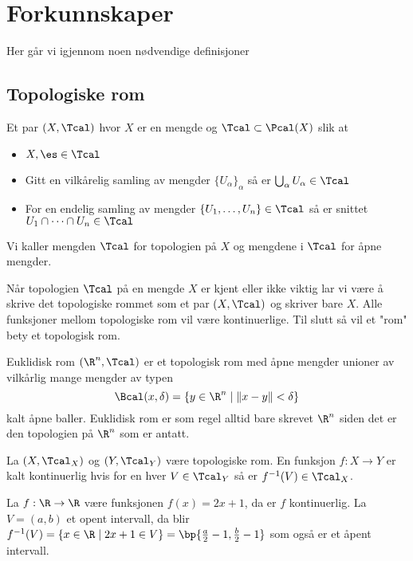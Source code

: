 \section{Forkunnskaper}
Her går vi igjennom noen nødvendige definisjoner

\subsection{Topologiske rom}\label{Sec:Top}
\begin{definition}\label{Def:TopRom}
    Et par $(X,\Tcal)$ hvor $X$ er en mengde og $\Tcal\subset\Pcal(X)$ slik at 
    \begin{itemize}
        \item $X,\es\in\Tcal$
        \item Gitt en vilkårelig samling av mengder $\{U_\alpha\}_{\alpha}$ så er $\bigcup_\alpha U_\alpha\in\Tcal$
        \item For en endelig samling av mengder $\{U_1,\dots,U_n\}\in\Tcal$ så er snittet $U_1\cap\dots\cap U_n\in\Tcal$
    \end{itemize}
    Vi kaller mengden $\Tcal$ for topologien på $X$ og mengdene i $\Tcal$ for åpne mengder.
\end{definition}

Når topologien $\Tcal$ på en mengde $X$ er kjent eller ikke viktig lar vi være å skrive det topologiske rommet som et par $(X,\Tcal)$ og skriver bare $X$. Alle funksjoner mellom topologiske rom vil være kontinuerlige. Til slutt så vil et "rom" bety et topologisk rom.

\begin{example}\label{Ex:EukRom}
    Euklidisk rom $(\R^n,\Tcal)$ er et topologisk rom med åpne mengder unioner av vilkårlig mange mengder av typen
    \[\Bcal(x,\delta) = \{y\in\R^n\;|\; \|x-y\|<\delta\}\]
    kalt åpne baller. Euklidisk rom er som regel alltid bare skrevet $\R^n$ siden det er den topologien på $\R^n$ som er antatt.
\end{example}

\begin{definition}\label{Def:KontFunk}
    La $(X,\Tcal_X)$ og $(Y,\Tcal_Y)$ være topologiske rom. En funksjon $f: X\to Y$ er kalt kontinuerlig hvis for en hver \(V\in\Tcal_Y\) så er \(f^{-1}(V)\in\Tcal_X\).
\end{definition}

\begin{example}\label{Ex:KontFunk}
    La $f: \R\to \R$ være funksjonen $f(x)=2x+1$, da er $f$ kontinuerlig. La $V = (a,b)$ et opent intervall, da blir $f^{-1}(V) = \{x\in\R\;|\;2x+1\in V\}=\bp{\frac{a}{2}-1,\frac{b}{2}-1}$ som også er et åpent intervall.
\end{example}


